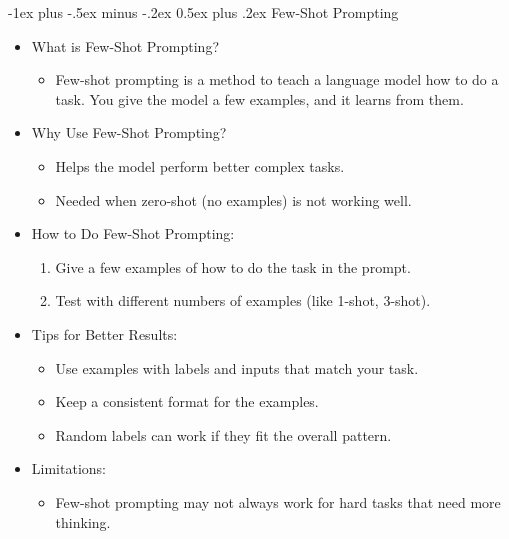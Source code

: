 \documentclass[10pt,landscape]{article}
\makeatletter
\renewcommand{\section}{\@startsection{section}{1}{0mm}%
                                {-1ex plus -.5ex minus -.2ex}%
                                {0.5ex plus .2ex}%
                                {\normalfont\large\bfseries}}
\makeatother
\begin{document}
\begin{multicols}{3}
% 
% 
% 
% 
% 

\section{Few-Shot Prompting}
\begin{itemize}
    \item What is Few-Shot Prompting?
    \begin{itemize}
        \item Few-shot prompting is a method to teach a language model how to do a task. You give the model a few examples, and it learns from them.
    \end{itemize}
    \item Why Use Few-Shot Prompting?
    \begin{itemize}
        \item Helps the model perform better complex tasks.
        \item Needed when zero-shot (no examples) is not working well.
    \end{itemize}
    \item How to Do Few-Shot Prompting:
    \begin{enumerate}
        \item Give a few examples of how to do the task in the prompt.
        \item Test with different numbers of examples (like 1-shot, 3-shot).
    \end{enumerate}
    \item Tips for Better Results:
    \begin{itemize}
        \item Use examples with labels and inputs that match your task.
        \item Keep a consistent format for the examples.
        \item Random labels can work if they fit the overall pattern.
    \end{itemize}
    \item Limitations:
    \begin{itemize}
        \item Few-shot prompting may not always work for hard tasks that need more thinking.
    \end{itemize}
\end{itemize}


\end{multicols}
\end{document}
